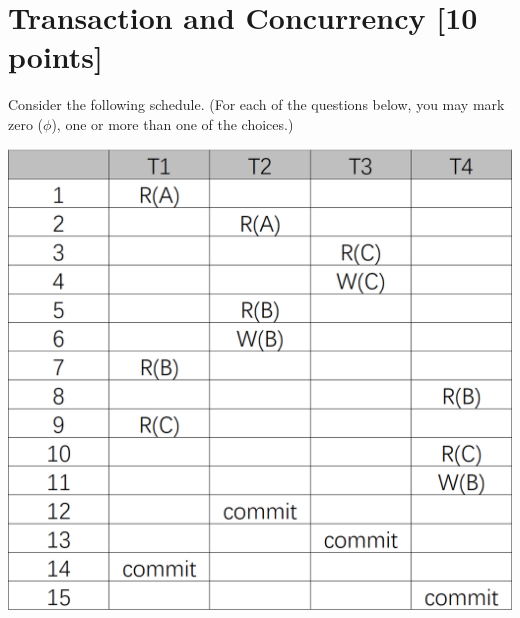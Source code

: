 \documentclass[10pt]{article}
\begin{document}
\section{Transaction and Concurrency \textbf{[10 points]}}
Consider the following schedule. (For each of the questions below, you may mark zero ($\phi$), one
or more than one of the choices.)
\begin{center}
	\includegraphics[scale=0.35]{transaction.png}
\end{center}
\end{document}
